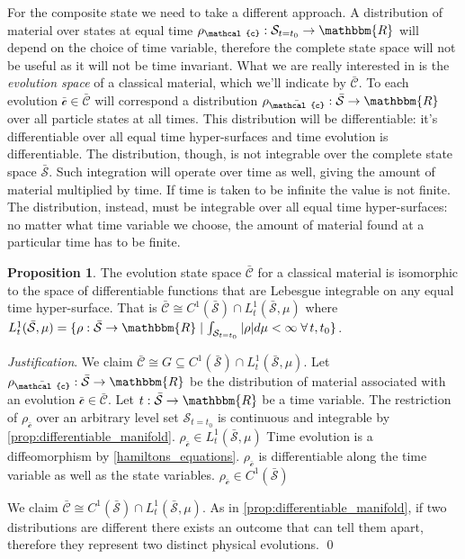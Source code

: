 \documentclass[aps,pra,10pt,twocolumn,floatfix,nofootinbib]{revtex4-1}
\numberwithin{equation}{section}
\theoremstyle{definition}
\newtheorem{prop}[equation]{Proposition}
\newenvironment{justification}{\emph{Justification}.}{\qed}
\begin{document}
For the composite state we need to take a different approach. A distribution of material over states at equal time $\rho_\mathcal{c} : \mathcal{S}_{t=t_0} \rightarrow \mathbbm{R}$ will depend on the choice of time variable, therefore the complete state space will not be useful as it will not be time invariant. What we are really interested in is the \emph{evolution space} of a classical material, which we'll indicate by $\bar{\mathcal{C}}$. To each evolution $\bar{\mathcal{c}} \in \bar{\mathcal{C}}$ will correspond a distribution $\rho_{\bar{\mathcal{c}}} : \bar{\mathcal{S}} \rightarrow \mathbbm{R}$ over all particle states at all times. This distribution will be differentiable: it's differentiable over all equal time hyper-surfaces and time evolution is differentiable. The distribution, though, is not integrable over the complete state space $\bar{\mathcal{S}}$. Such integration will operate over time as well, giving the amount of material multiplied by time. If time is taken to be infinite the value is not finite. The distribution, instead, must be integrable over all equal time hyper-surfaces: no matter what time variable we choose, the amount of material found at a particular time has to be finite.

\begin{prop}\label{material_evolution_state_space}
	The evolution state space $\bar{\mathcal{C}}$ for a classical material is isomorphic to the space of differentiable functions that are Lebesgue integrable on any equal time hyper-surface. That is $\bar{\mathcal{C}} \cong  C^1(\bar{\mathcal{S}})\cap L^1_t(\bar{\mathcal{S}}, \mu)$ where $L^1_t(\bar{\mathcal{S}}, \mu)=\{{\rho: \bar{\mathcal{S}} \rightarrow \mathbbm{R}} \; | \; {\int_{\mathcal{S}_{t=t_0}} |\rho| d\mu < \infty} \; \forall \, t, t_0 \}$.
\end{prop}

\begin{justification}
	We claim $\bar{\mathcal{C}} \cong  G \subseteq C^1(\bar{\mathcal{S}})\cap L^1_t(\bar{\mathcal{S}}, \mu)$. Let $\rho_{\bar{\mathcal{c}}} : \bar{\mathcal{S}} \rightarrow \mathbbm{R}$ be the distribution of material associated with an evolution $\bar{\mathcal{c}} \in \bar{\mathcal{C}}$. Let $t : \bar{\mathcal{S}} \rightarrow \mathbbm{R}$ be a time variable. 
	The restriction of $\rho_{\bar{\mathcal{c}}}$ over an arbitrary level set $\mathcal{S}_{t=t_0}$ is continuous and integrable by \ref{prop:differentiable_manifold}. $\rho_{\bar{\mathcal{c}}} \in L^1_t(\bar{\mathcal{S}}, \mu)$ Time evolution is a diffeomorphism by \ref{hamiltons_equations}. $\rho_{\bar{\mathcal{c}}}$ is differentiable along the time variable as well as the state variables. $\rho_{\bar{\mathcal{c}}} \in C^1(\bar{\mathcal{S}})$
	
	We claim $\bar{\mathcal{C}} \cong  C^1(\bar{\mathcal{S}})\cap L^1_t(\bar{\mathcal{S}}, \mu)$. As in \ref{prop:differentiable_manifold}, if two distributions are different there exists an outcome that can tell them apart, therefore they represent two distinct physical evolutions.
\end{justification}
\end{document}
